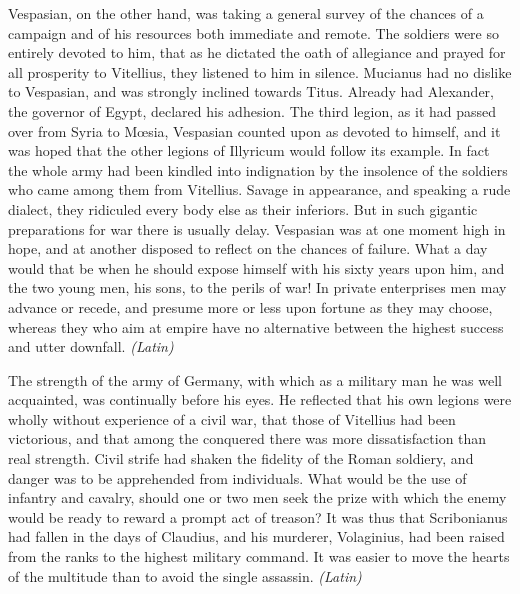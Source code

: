 
Vespasian, on the other hand, was taking a general survey of the chances of a campaign and of his resources both immediate and remote. The soldiers were so entirely devoted to him, that as he dictated the oath of allegiance and prayed for all prosperity to Vitellius, they listened to him in silence. Mucianus had no dislike to Vespasian, and was strongly inclined towards Titus. Already had Alexander, the governor of Egypt, declared his adhesion. The third legion, as it had passed over from Syria to Mœsia, Vespasian counted upon as devoted to himself, and it was hoped that the other legions of Illyricum would follow its example. In fact the whole army had been kindled into indignation by the insolence of the soldiers who came among them from Vitellius. Savage in appearance, and speaking a rude dialect, they ridiculed every body else as their inferiors. But in such gigantic preparations for war there is usually delay. Vespasian was at one moment high in hope, and at another disposed to reflect on the chances of failure. What a day would that be when he should expose himself with his sixty years upon him, and the two young men, his sons, to the perils of war! In private enterprises men may advance or recede, and presume more or less upon fortune as they may choose, whereas they who aim at empire have no alternative between the highest success and utter downfall. \emph{(Latin)}


The strength of the army of Germany, with which as a military man he was well acquainted, was continually before his eyes. He reflected that his own legions were wholly without experience of a civil war, that those of Vitellius had been victorious, and that among the conquered there was more dissatisfaction than real strength. Civil strife had shaken the fidelity of the Roman soldiery, and danger was to be apprehended from individuals. What would be the use of infantry and cavalry, should one or two men seek the prize with which the enemy would be ready to reward a prompt act of treason? It was thus that Scribonianus had fallen in the days of Claudius, and his murderer, Volaginius, had been raised from the ranks to the highest military command. It was easier to move the hearts of the multitude than to avoid the single assassin. \emph{(Latin)}



